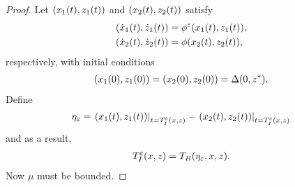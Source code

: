 \begin{proof}
  Let $(x_{1}(t), z_{1}(t))$ and $(x_{2}(t), z_{2}(t))$ satisfy
  \begin{align}
    \nonumber
    ({\dot {x}}_{1}(t), {\dot {z}}_{1}(t)) &= \phi^{\varepsilon}(x_{1}(t), z_{1}(t)),\\
    ({\dot {x}}_{2}(t), {\dot {z}}_{2}(t)) &= \phi(x_{2}(t), z_{2}(t)),
  \end{align}
  respectively, with initial conditions
  \begin{align}
    (x_{1}(0), z_{1}(0)) = (x_{2}(0), z_{2}(0)) = \Delta(0, z^{*}).
  \end{align}
  Define
  \begin{align}
    \label{eq:etaeps}
    \eta_{\varepsilon} = \left.(x_{1}(t), z_{1}(t))\right|_{t = T_{I}^{\varepsilon}(x, z)} - \left.(x_{2}(t), z_{2}(t))\right|_{t = T_{I}^{\varepsilon}(x, z)}
  \end{align}
  and as a result,
  \begin{align}
    T_{I}^{\varepsilon}(x, z) = T_{B}(\eta_{\varepsilon}, x, z).
  \end{align}
  Now $\mu$ must be bounded.


\end{proof}
